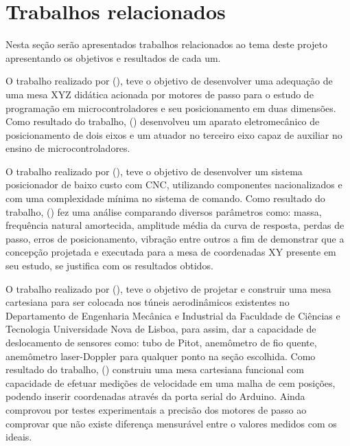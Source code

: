\section{Trabalhos relacionados}\label{sec:trabalhos}

Nesta seção serão apresentados trabalhos relacionados ao tema deste projeto apresentando os objetivos e resultados 
de cada um.

O trabalho realizado por \citeauthor{butignol2017adequaccao} (\citeyear{butignol2017adequaccao}), 
teve o objetivo de desenvolver uma adequação de uma mesa XYZ didática acionada por motores 
de passo para o estudo de programação em microcontroladores e seu posicionamento em duas dimensões.
Como resultado do trabalho, \citeauthor{butignol2017adequaccao} (\citeyear{butignol2017adequaccao}) 
desenvolveu um aparato eletromecânico de posicionamento de dois eixos e um atuador no terceiro eixo 
capaz de auxiliar no ensino de microcontroladores. 

O trabalho realizado por \citeauthor{camargo1988mesa} (\citeyear{camargo1988mesa}), teve o objetivo de 
desenvolver um sistema posicionador de baixo custo com \ac{CNC}, utilizando componentes 
nacionalizados e com uma complexidade mínima no sistema de comando.
Como resultado do trabalho, \citeauthor{camargo1988mesa} (\citeyear{camargo1988mesa}) fez uma análise 
comparando diversos parâmetros como: massa, frequência natural amortecida, amplitude média da curva de 
resposta, perdas de passo, erros de posicionamento, vibração entre outros a fim de demonstrar que a 
concepção projetada e executada para a mesa de coordenadas XY presente em seu estudo, se 
justifica com os resultados obtidos.

O trabalho realizado por \citeauthor{ramos2018desenvolvimento} (\citeyear{ramos2018desenvolvimento}), 
teve o objetivo de projetar e construir uma mesa cartesiana para ser colocada nos túneis 
aerodinâmicos existentes no Departamento de Engenharia Mecânica e Industrial da Faculdade de Ciências e 
Tecnologia Universidade Nova de Lisboa, para assim, dar a capacidade de deslocamento de sensores como: tubo de Pitot, 
anemômetro de fio quente, anemômetro laser-Doppler para qualquer ponto na seção escolhida.
Como resultado do trabalho, \citeauthor{ramos2018desenvolvimento} (\citeyear{ramos2018desenvolvimento}) construiu 
uma mesa cartesiana funcional com capacidade de efetuar medições de velocidade em uma malha de cem posições, 
podendo inserir coordenadas através da porta serial do Arduino. Ainda comprovou por testes experimentais a 
precisão dos motores de passo ao comprovar que não existe diferença mensurável entre o valores medidos com os ideais.

